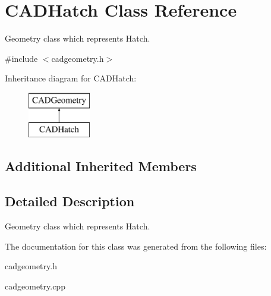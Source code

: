 \hypertarget{class_c_a_d_hatch}{}\section{C\+A\+D\+Hatch Class Reference}
\label{class_c_a_d_hatch}


Geometry class which represents Hatch.  




{\ttfamily \#include $<$cadgeometry.\+h$>$}

Inheritance diagram for C\+A\+D\+Hatch\+:\begin{figure}[H]
\begin{center}
\leavevmode
\includegraphics[height=2.000000cm]{class_c_a_d_hatch}
\end{center}
\end{figure}
\subsection*{Additional Inherited Members}


\subsection{Detailed Description}
Geometry class which represents Hatch. 

The documentation for this class was generated from the following files\+:\begin{DoxyCompactItemize}
\item 
cadgeometry.\+h\item 
cadgeometry.\+cpp\end{DoxyCompactItemize}

